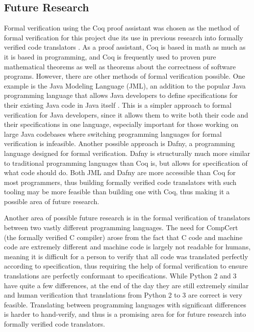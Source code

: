 \subsection{Future Research}
Formal verification using the Coq proof assistant was chosen as the method of formal verification for this project due its use in previous research into formally verified code translators \autocite{Leroy}\autocite{Zhao}. As a proof assistant, Coq is based in math as much as it is based in programming, and Coq is frequently used to proven pure mathematical theorems as well as theorems about the correctness of software programs. However, there are other methods of formal verification possible. One example is the Java Modeling Language (JML), an addition to the popular Java programming language that allows Java developers to define specifications for their existing Java code in Java itself \autocite{Burdy}. This is a simpler approach to formal verification for Java developers, since it allows them to write both their code and their specifications in one language, especially important for those working on large Java codebases where switching programming languages for formal verification is infeasible. Another possible approach is Dafny, a programming language designed for formal verification. Dafny is structurally much more similar to traditional programming languages than Coq is, but allows for specification of what code should do. Both JML and Dafny are more accessible than Coq for most programmers, thus building formally verified code translators with such tooling may be more feasible than building one with Coq, thus making it a possible area of future research.

Another area of possible future research is in the formal verification of translators between two vastly different programming languages. The need for CompCert (the formally verified C compiler) arose from the fact that C code and machine code are extremely different and machine code is largely not readable for humans, meaning it is difficult for a person to verify that all code was translated perfectly according to specification, thus requiring the help of formal verification to ensure translations are perfectly conformant to specifications. While Python 2 and 3 have quite a few differences, at the end of the day they are still extremely similar and human verification that translations from Python 2 to 3 are correct is very feasible. Translating between programming languages with significant differences is harder to hand-verify, and thus is a promising area for for future research into formally verified code translators.